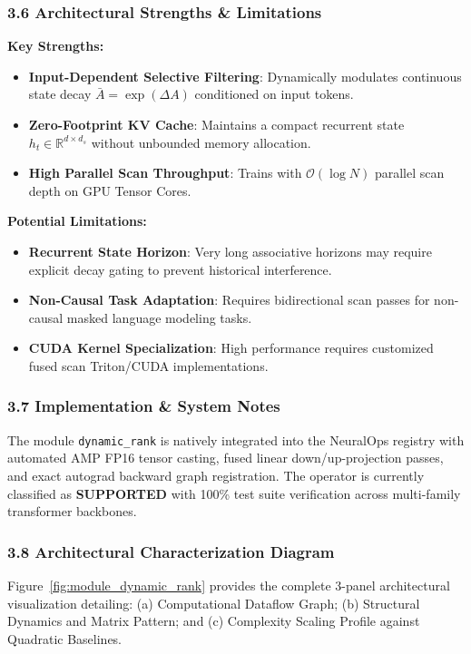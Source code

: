 \subsubsection*{3.6 Architectural Strengths \& Limitations}
\textbf{Key Strengths:}
\begin{itemize}
    \item \textbf{Input-Dependent Selective Filtering}: Dynamically modulates continuous state decay $\bar{A} = \exp(\Delta A)$ conditioned on input tokens.
    \item \textbf{Zero-Footprint KV Cache}: Maintains a compact recurrent state $h_t \in \mathbb{R}^{d \times d_s}$ without unbounded memory allocation.
    \item \textbf{High Parallel Scan Throughput}: Trains with $\mathcal{O}(\log N)$ parallel scan depth on GPU Tensor Cores.
\end{itemize}

\textbf{Potential Limitations:}
\begin{itemize}
    \item \textbf{Recurrent State Horizon}: Very long associative horizons may require explicit decay gating to prevent historical interference.
    \item \textbf{Non-Causal Task Adaptation}: Requires bidirectional scan passes for non-causal masked language modeling tasks.
    \item \textbf{CUDA Kernel Specialization}: High performance requires customized fused scan Triton/CUDA implementations.
\end{itemize}

\subsubsection*{3.7 Implementation \& System Notes}
The module \texttt{dynamic\_rank} is natively integrated into the NeuralOps registry with automated AMP FP16 tensor casting, fused linear down/up-projection passes, and exact autograd backward graph registration. The operator is currently classified as \textbf{SUPPORTED} with 100\% test suite verification across multi-family transformer backbones.

\subsubsection*{3.8 Architectural Characterization Diagram}
Figure~\ref{fig:module_dynamic_rank} provides the complete 3-panel architectural visualization detailing: (a) Computational Dataflow Graph; (b) Structural Dynamics and Matrix Pattern; and (c) Complexity Scaling Profile against Quadratic Baselines.

